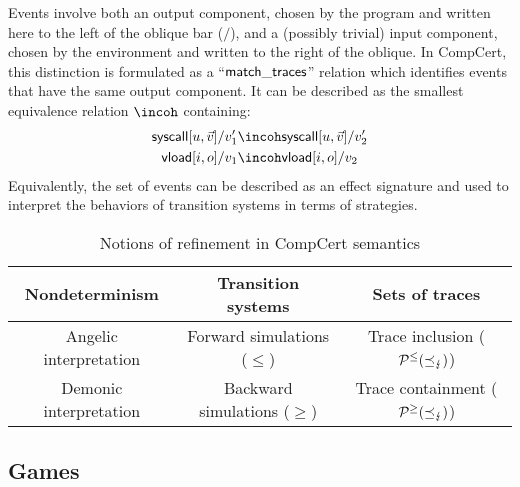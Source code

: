 \documentclass[acmsmall,review,anonymous]{acmart}\settopmatter{printfolios=true,printccs=false,printacmref=false}
\begin{document}
Events involve both an output component,
chosen by the program and
written here to the left of the oblique bar ($/$),
and a (possibly trivial) input component,
chosen by the environment and written to the right of the oblique.
In CompCert,
this distinction is formulated as a ``$ \mathsf{match\_traces} $'' relation
which identifies events that have the same output component.
It can be described as the smallest equivalence relation $\incoh$
containing:
\begin{align*}
  \kw{syscall}[u, \vec{v}]/v_1' &\incoh
  \kw{syscall}[u, \vec{v}]/v_2'
  \\
  \kw{vload}[i, o]/v_1 &\incoh
  \kw{vload}[i, o]/v_2
\end{align*}
Equivalently,
the set of events can be described as an effect signature
and used to interpret the behaviors of transition systems
in terms of strategies.


\begin{table*} %
  \caption{Notions of refinement in CompCert semantics}
  \label{tbl:compcertref}
  \centering
  \begin{tabular}{ccc}
    \hline
    Nondeterminism
      & Transition systems
      & Sets of traces \\
    \hline
    Angelic interpretation
      & Forward simulations ($\le$)
      & Trace inclusion ($\mathcal{P}^\le(\preceq_\lightning)$) \\
    Demonic interpretation
      & Backward simulations ($\ge$)
      & Trace containment ($\mathcal{P}^\ge(\preceq_\lightning)$) \\
    \hline
  \end{tabular}
\end{table*}

\subsection{Games} \label{sec:sem:games} %
\end{document}
